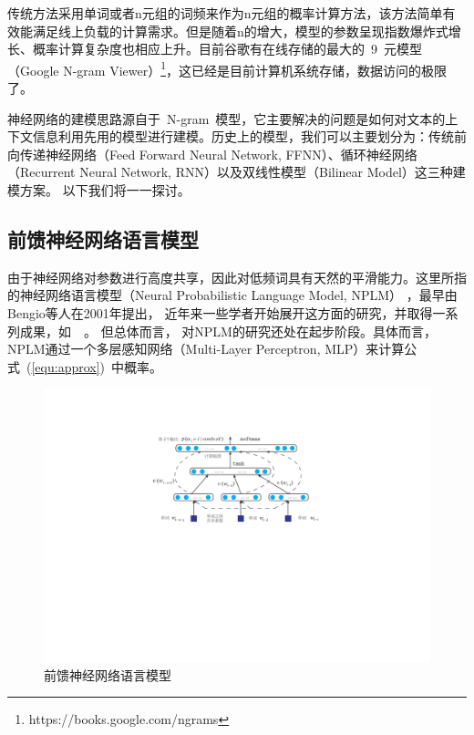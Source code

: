 传统方法采用单词或者n元组的词频来作为n元组的概率计算方法，该方法简单有效能满足线上负载的计算需求。但是随着n的增大，模型的参数呈现指数爆炸式增长、概率计算复杂度也相应上升。目前谷歌有在线存储的最大的~9~元模型（Google N-gram Viewer）\footnote{https://books.google.com/ngrams}，这已经是目前计算机系统存储，数据访问的极限了。


神经网络的建模思路源自于~N-gram~模型，它主要解决的问题是如何对文本的上下文信息利用先用的模型进行建模。历史上的模型，我们可以主要划分为：传统前向传递神经网络（Feed Forward Neural Network, FFNN）、循环神经网络（Recurrent Neural Network, RNN）以及双线性模型（Bilinear Model）这三种建模方案。 以下我们将一一探讨。


\subsection{前馈神经网络语言模型}
由于神经网络对参数进行高度共享，因此对低频词具有天然的平滑能力。这里所指的神经网络语言模型（Neural Probabilistic Language Model, NPLM） ，最早由Bengio等人在2001年提出， 近年来一些学者开始展开这方面的研究，并取得一系列成果，如~\cite{DBLP:conf/acl/BaroniDK14,DBLP:journals/sigkdd/BellK07,DBLP:journals/pami/BengioCV13,DBLP:journals/tnn/BengioSF94}~。 但总体而言， 对NPLM的研究还处在起步阶段。具体而言，NPLM通过一个多层感知网络（Multi-Layer Perceptron, MLP）来计算公式~(\ref{equ:approx})~中概率。
\begin{figure}
  \centering
  \includegraphics[width=.85\linewidth]{./figures/nplm.pdf}
  \caption{前馈神经网络语言模型}\label{fig:nplm}
\end{figure}

